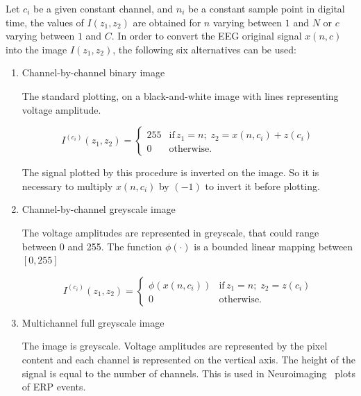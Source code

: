 
Let $c_i$ be a given constant channel, and $n_i$ be a constant sample point in digital time,  the values of $I(z_1,z_2)$ are obtained for $n$ varying between $1$ and $N$ or $c$ varying between $1$ and $C$.   In order to convert the EEG original signal $x(n,c)$ into the image $I(z_1,z_2)$, the following six alternatives can be used:

\begin{enumerate}
\item Channel-by-channel binary image

The standard plotting, on a black-and-white image with lines representing voltage amplitude.

\begin{equation}
I^{(c_i)}(z_1,z_2)= \left\{ \begin{array}{rl}
255 & \text{if} \,  z_1 =  n; \; z_2 = x(n,c_i) + z(c_i) \\
0   & \mbox{otherwise}.
\end{array}\right.
\label{eq:image1}
\end{equation}

The signal plotted by this procedure is inverted on the image.  So it is necessary to multiply $x(n,c_i)$ by $(-1)$ to invert it before plotting.

\item Channel-by-channel greyscale image

The voltage amplitudes are represented in greyscale, that could range between 0 and 255.  The function $\phi( \cdot )$ is a bounded linear mapping between $\left[ 0,255 \right]$

\begin{equation}
I^{(c_i)}(z_1,z_2)= \left\{ \begin{array}{rl}
\phi(x(n,c_i)) & \text{if} \,  z_1 = n; \; z_2 = z(c_i) \\
0   & \mbox{otherwise}.
\end{array}\right.
\label{eq:image2}
\end{equation}

\item Multichannel full greyscale image

The image is greyscale. Voltage amplitudes are represented by the pixel content and each channel is represented on the vertical axis.  The height of the signal is equal to the number of channels.   This is used in Neuroimaging~\cite{Freeman2013} plots of ERP events.


\end{enumerate}
